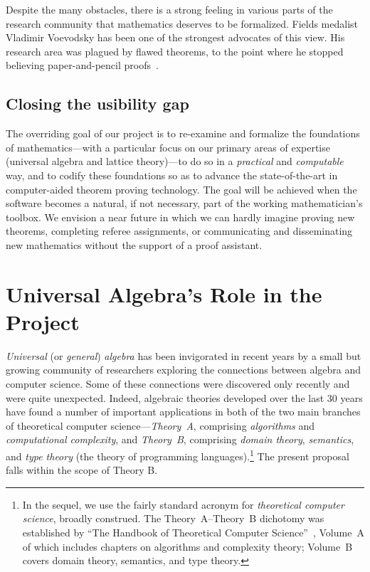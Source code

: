 \documentclass[12pt]{amsart}  %
\begin{document}
  Despite the many obstacles, there is a strong
  feeling in various parts of the research community that mathematics deserves to
  be formalized. Fields medalist Vladimir Voevodsky has been one of
  the strongest advocates of this view. His research area was plagued by flawed theorems,
  to the point where he stopped believing paper-and-pencil proofs~\cite{rehmeyer:2013}.


\subsection{Closing the usibility gap}

The overriding goal of our project is to re-examine and formalize the foundations of 
mathematics---with a particular focus on our primary areas of expertise (universal algebra and lattice theory)---to do so in a \emph{practical} and \emph{computable} way, and to codify these foundations so as to advance the state-of-the-art in 
computer-aided theorem proving technology. The goal will be achieved when the 
software becomes a natural, if not necessary, part of the working mathematician's toolbox.  We envision a near future in which we can hardly imagine proving new theorems, completing referee assignments, or communicating and disseminating new mathematics without the support of a proof assistant.



\section{Universal Algebra's Role in the Project}
\emph{Universal} (or \emph{general}) \emph{algebra} has been invigorated in recent years by a small but growing community of researchers exploring the connections between algebra and computer science. Some of these connections were discovered only recently and were quite unexpected. Indeed, algebraic theories developed over the last 30 years have found a number of important applications in both of the two main branches of theoretical computer science---\emph{Theory~A}, comprising \emph{algorithms} and \emph{computational complexity}, and \emph{Theory~B}, comprising
\emph{domain theory}, \emph{semantics}, and \emph{type theory} (the theory of programming 
languages).\footnote{In the sequel, we use the fairly standard acronym \tcs for \emph{theoretical                          computer  science}, broadly construed.
                    The Theory~A--Theory~B dichotomy was established by ``The Handbook of Theoretical Computer Science''~\cite{vanLeeuwen:1991A,vanLeeuwen:1991B}, Volume~A of which includes chapters on algorithms and complexity theory; Volume~B covers domain theory, semantics, and type theory.}
The present proposal falls within the scope of Theory B.
\end{document}
